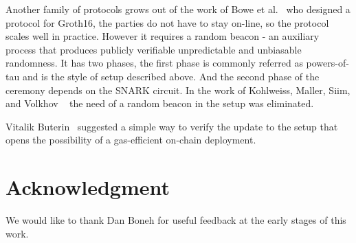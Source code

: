 \documentclass{article}
\begin{document}
Another family of protocols grows out of the work of Bowe et al.~\cite{bowe2017scalable} who designed a protocol for Groth16, the parties do not have to stay on-line, so the protocol scales well in practice. However it requires a random beacon - an auxiliary process that produces publicly verifiable unpredictable and unbiasable randomness. It has two phases, the first phase is commonly referred as powers-of-tau and is the style of setup described above. And the second phase of the ceremony depends on the SNARK circuit. In the work of Kohlweiss, Maller, Siim, and Volkhov ~\cite{kohlweiss2021snarky} the need of a random beacon in the setup was eliminated.

Vitalik Buterin~\cite{buterintrustedsetup} suggested a simple way to verify the update to the setup that opens the possibility of a gas-efficient on-chain deployment.

\section*{Acknowledgment}\nonumber We would like to thank Dan Boneh for useful feedback at the early stages of this work.


\end{document}
